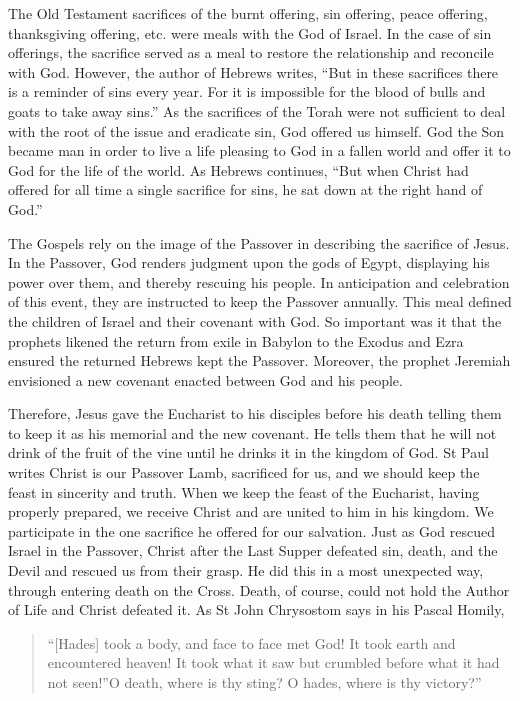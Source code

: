 \documentclass[
]{article}
\begin{document}
The Old Testament sacrifices of the burnt offering, sin offering, peace
offering, thanksgiving offering, etc. were meals with the God of Israel.
In the case of sin offerings, the sacrifice served as a meal to restore
the relationship and reconcile with God. However, the author of Hebrews
writes, ``But in these sacrifices there is a reminder of sins every
year. For it is impossible for the blood of bulls and goats to take away
sins.'' As the sacrifices of the Torah were not sufficient to deal with
the root of the issue and eradicate sin, God offered us himself. God the
Son became man in order to live a life pleasing to God in a fallen world
and offer it to God for the life of the world. As Hebrews continues,
``But when Christ had offered for all time a single sacrifice for sins,
he sat down at the right hand of God.''

The Gospels rely on the image of the Passover in describing the
sacrifice of Jesus. In the Passover, God renders judgment upon the gods
of Egypt, displaying his power over them, and thereby rescuing his
people. In anticipation and celebration of this event, they are
instructed to keep the Passover annually. This meal defined the children
of Israel and their covenant with God. So important was it that the
prophets likened the return from exile in Babylon to the Exodus and Ezra
ensured the returned Hebrews kept the Passover. Moreover, the prophet
Jeremiah envisioned a new covenant enacted between God and his people.

Therefore, Jesus gave the Eucharist to his disciples before his death
telling them to keep it as his memorial and the new covenant. He tells
them that he will not drink of the fruit of the vine until he drinks it
in the kingdom of God. St Paul writes Christ is our Passover Lamb,
sacrificed for us, and we should keep the feast in sincerity and truth.
When we keep the feast of the Eucharist, having properly prepared, we
receive Christ and are united to him in his kingdom. We participate in
the one sacrifice he offered for our salvation. Just as God rescued
Israel in the Passover, Christ after the Last Supper defeated sin,
death, and the Devil and rescued us from their grasp. He did this in a
most unexpected way, through entering death on the Cross. Death, of
course, could not hold the Author of Life and Christ defeated it. As St
John Chrysostom says in his Pascal Homily,

\begin{quote}
``{[}Hades{]} took a body, and face to face met God! It took earth and
encountered heaven! It took what it saw but crumbled before what it had
not seen!''O death, where is thy sting? O hades, where is thy victory?''
\end{quote}
\end{document}
